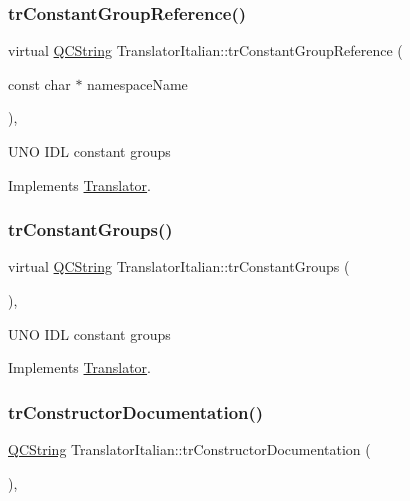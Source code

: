 \subsubsection{\texorpdfstring{trConstantGroupReference()}{trConstantGroupReference()}}
{\footnotesize\ttfamily virtual \mbox{\hyperlink{class_q_c_string}{Q\+C\+String}} Translator\+Italian\+::tr\+Constant\+Group\+Reference (\begin{DoxyParamCaption}\item[{const char $\ast$}]{namespace\+Name }\end{DoxyParamCaption})\hspace{0.3cm}{\ttfamily [inline]}, {\ttfamily [virtual]}}

U\+NO I\+DL constant groups 

Implements \mbox{\hyperlink{class_translator}{Translator}}.

\mbox{\label{class_translator_italian_a7fab084fa0806a6e7a4eb26953125a39}} 
\subsubsection{\texorpdfstring{trConstantGroups()}{trConstantGroups()}}
{\footnotesize\ttfamily virtual \mbox{\hyperlink{class_q_c_string}{Q\+C\+String}} Translator\+Italian\+::tr\+Constant\+Groups (\begin{DoxyParamCaption}{ }\end{DoxyParamCaption})\hspace{0.3cm}{\ttfamily [inline]}, {\ttfamily [virtual]}}

U\+NO I\+DL constant groups 

Implements \mbox{\hyperlink{class_translator}{Translator}}.

\mbox{\label{class_translator_italian_aff7449d7a634f167b55fc326d2ac699c}} 
\subsubsection{\texorpdfstring{trConstructorDocumentation()}{trConstructorDocumentation()}}
{\footnotesize\ttfamily \mbox{\hyperlink{class_q_c_string}{Q\+C\+String}} Translator\+Italian\+::tr\+Constructor\+Documentation (\begin{DoxyParamCaption}{ }\end{DoxyParamCaption})\hspace{0.3cm}{\ttfamily [inline]}, {\ttfamily [virtual]}}

